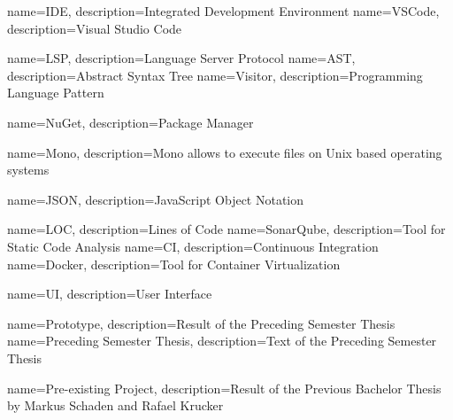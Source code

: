 {
	name=IDE,
	description={Integrated Development Environment}
}
{
	name=VSCode,
	description={Visual Studio Code}
}

{
	name=LSP,
	description={Language Server Protocol}
}
{
	name=AST,
	description={Abstract Syntax Tree}
}
{
	name=Visitor,
	description={Programming Language Pattern}
}

{
	name=NuGet,
	description={Package Manager}
}

{
	name=Mono,
	description={Mono allows to execute  files on Unix based operating systems}
}

{
	name=JSON,
	description={JavaScript Object Notation}
}

{
	name=LOC,
	description={Lines of Code}
}
{
	name=SonarQube,
	description={Tool for Static Code Analysis}
}
{
	name=CI,
	description={Continuous Integration}
}
{
	name=Docker,
	description={Tool for Container Virtualization}
}

{
	name=UI,
	description={User Interface}
}


{
	name=Prototype,
	description={Result of the Preceding Semester Thesis}
}
{
	name=Preceding Semester Thesis,
	description={Text of the Preceding Semester Thesis}
}

{
	name=Pre-existing Project,
	description={Result of the Previous Bachelor Thesis by Markus Schaden and Rafael Krucker}
}





